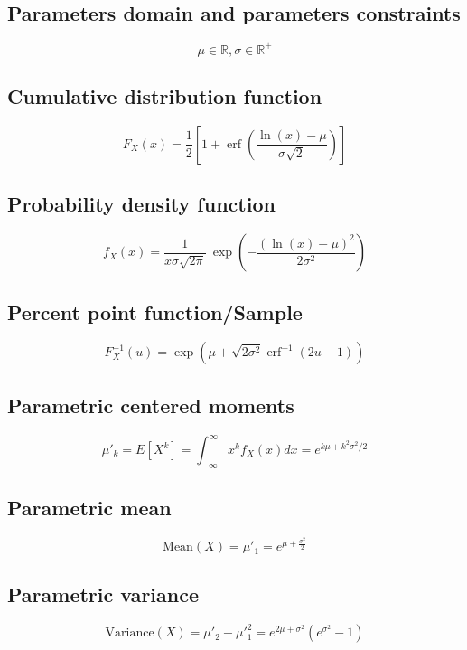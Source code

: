 \documentclass{article}
\begin{document}
\subsection{Parameters domain and parameters constraints}
\begin{equation*} \mu\in\mathbb{R}, \sigma\in\mathbb{R}^{+} \end{equation*}
\subsection{Cumulative distribution function}
\begin{equation*} F_{X}\left(x\right)=\frac{1}{2}\left[1+\operatorname{erf}\left(\frac{\ln (x)-\mu}{\sigma\sqrt{2}}\right)\right] \end{equation*}
\subsection{Probability density function}
\begin{equation*} f_{X}\left(x\right)=\frac 1 {x\sigma\sqrt{2\pi}}\ \exp\left(-\frac{\left(\ln\left(x\right) -\mu\right)^2}{2\sigma^2}\right) \end{equation*}
\subsection{Percent point function/Sample}
\begin{equation*} F^{-1}_{X}\left(u\right)=\exp(\mu+\sqrt{2\sigma^2}\operatorname{erf}^{-1}(2u-1)) \end{equation*}
\subsection{Parametric centered moments}
\begin{equation*} \mu'_{k}=E[X^k]=\int_{-\infty}^{\infty}x^{k}f_{X}\left(x\right)dx=e^{k\mu+k^2\sigma^2/2} \end{equation*}
\subsection{Parametric mean}
\begin{equation*} \mathrm{Mean}(X)=\mu'_{1}=e^{\mu + \frac{\sigma^2}{2}} \end{equation*}
\subsection{Parametric variance}
\begin{equation*} \mathrm{Variance}(X)=\mu'_{2}-\mu'^{2}_{1}=e^{2\mu+\sigma^2}(e^{\sigma^2}-1) \end{equation*}
\end{document}
